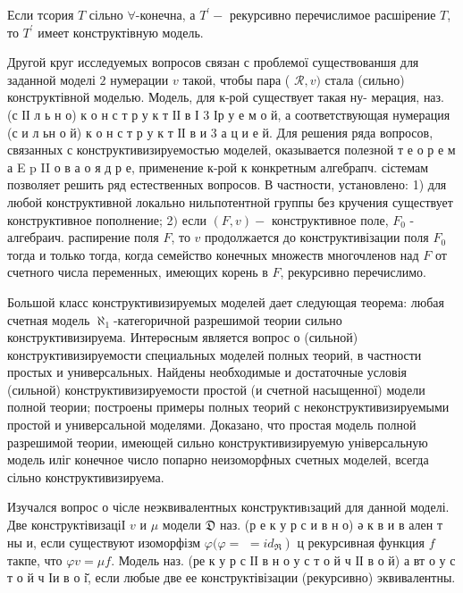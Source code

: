 \documentclass[10pt]{article}
\begin{document}
Если тсория $T$ сільно $\forall$-конечна, а $T^{\prime}-$ рекурсивно перечислимое расшірение $T$, то $T^{\prime}$ имеет конструктівную модель.



Другой круг исследуемых вопросов связан с проблемої существованшя для заданной моделі $\mathfrak{2}$ нумерации $v$ такоӥ, чтобы пара ( $\mathcal{R}, v)$ стала (сильно) конструктівной моделью. Модель, для к-рой существует такая ну- мерация, наз. (с ІІ л ь н о) к о н с т р у к т ІІ в І 3 Ір у е м о й, а соответствующая нумерация (с и л ьн о й) к о н с т р у к т ІІ в и 3 а ц и е й. Для решения ряда вопросов, связанных с конструктивизируемостью моделей, оказывается полезной т е о р е м а E p II о в а о я д р е, применение к-рой к конкретным алгебрапч. сістемам позволяет решить ряд естественных вопросов. В частности, установлено: 1) для любой конструктивной локально нильпотентной группы без кручения существует конструктивное пополнение; 2$)$ если $(F, v)-$ конструктивное поле, $F_{0}$ - алгебраич. распирение поля $F$, то $v$ продолжается до конструктивізации поля $F_{0}$ тогда и только тогда, когда семейство конечных множеств многочленов над $F$ от счетного числа переменных, имеющих корень в $F$, рекурсивно перечислимо.



Большой класс конструктивизируемых моделей дает следующая теорема: любая счетная модель $\aleph_{1}$-категоричной разрешимой теории сильно конструктивизируема. Интерөсным является вопрос о (сильной) конструктивизируемости специальных моделей полных теорий, в частности простых и универсальных. Найдены необходимые и достаточные условія (сильной) конструктивизируемости простой (и счетной насыщенної) модели полной теории; построены примеры полных теорий с неконструктивизируемыми простой и универсальной моделями. Доказано, что простая модель полной разрешимой теории, имеющей сильно конструктивизируемую універсальную модель иліг конечное число попарно неизоморфных счетных моделей, всегда сільно конструктивизируема.



Изучался вопрос о чісле неэквивалентных конструктивıзаций для данной моделі. Две конструктівизаціІ $v$ и $\mu$ модели $\mathfrak{D}$ наз. (р е к у р с и в н о) ә к в и в ален т ны и, если существуют изоморфізм $\varphi(\varphi=$ $\left.=i d_{\Re}\right)$ ц рекурсивная функция $f$ такпе, что $\varphi v=\mu f$. Модель наз. (ре к у р с ІІ в н о у с т о й ч ІІ в о й) а вт о у с т о й ч Іи в о і̆, если любые две ее конструктівізации (рекурсивно) эквивалентны.
\end{document}
